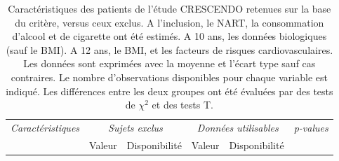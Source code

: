 \begin {table}
\caption{Caractéristiques des patients de l’étude CRESCENDO retenues sur la base du critère, versus ceux exclus. A
l’inclusion, le NART, la consommation d’alcool et de cigarette ont été estimés. A 10 ans, les données biologiques (sauf le
BMI). A 12 ans, le BMI, et les facteurs de risques cardiovasculaires. Les données sont exprimées avec la moyenne et l’écart
type sauf cas contraires. Le nombre d’observations disponibles pour chaque variable est indiqué. Les différences entre les
deux groupes ont été évaluées par des tests de $\chi^2$ et des tests T.} 
\label{tab:crescendo} 
\centering
\begin{tabularx}{17cm}{X | c c c c c}
	{\em Caractéristiques } & 
	\multicolumn{2}{c}{{\em Sujets exclus}} &
	\multicolumn{2}{c}{{\em Données utilisables}} &
	{\em p-values}\\
	 & Valeur & Disponibilité & Valeur & Disponibilité & \\


\end{tabularx}
\end{table}
